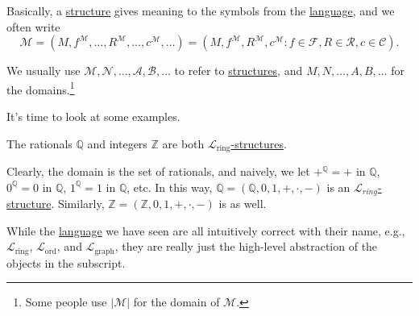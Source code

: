 Basically, a \hyperref[def:structure]{structure} gives meaning to the symbols from the \hyperref[def:language]{language}, and we often write
\[
	\mathcal{M}
	= (M, f^{\mathcal{M} }, \ldots , R^{\mathcal{M} }, \ldots , c^{\mathcal{M} }, \ldots)
	= (M, f^{\mathcal{M} }, R^{\mathcal{M} }, c^{\mathcal{M} } \colon f\in \mathcal{F} , R\in \mathcal{R} , c\in \mathcal{C} ).
\]

\begin{notation}
	We usually use \(\mathcal{M} , \mathcal{N} , \ldots , \mathcal{A} , \mathcal{B} , \ldots \) to refer to \hyperref[def:structure]{structures}, and \(M, N, \ldots , A, B, \ldots \) for the domains.\footnote{Some people use \(\vert \mathcal{M}  \vert \) for the domain of \(\mathcal{M} \).}
\end{notation}

It's time to look at some examples.

\begin{eg}
	The rationals \(\mathbb{Q} \) and integers \(\mathbb{Z} \) are both \hyperref[def:structure]{\(\mathcal{L} _{\text{ring} }\)-structures}.
\end{eg}
\begin{explanation}
	Clearly, the domain is the set of rationals, and naively, we let \(+^{\mathbb{Q} } = +\) in \(\mathbb{Q} \), \(0^{\mathbb{Q} } = 0\) in \(\mathbb{Q} \), \(1^{\mathbb{Q} } = 1\) in \(\mathbb{Q} \), etc. In this way, \(\mathbb{Q} = (\mathbb{Q} , 0, 1, +, \cdot, -)\) is an \hyperref[def:structure]{\(\mathcal{L} _{ring}\)-structure}. Similarly, \(\mathbb{Z} = (\mathbb{Z} , 0, 1, +, \cdot, -)\) is as well.
\end{explanation}

While the \hyperref[def:language]{language} we have seen are all intuitively correct with their name, e.g., \(\mathcal{L} _{\text{ring} }\), \(\mathcal{L} _{\text{ord} }\), and \(\mathcal{L} _{\text{graph} }\), they are really just the high-level abstraction of the objects in the subscript.

